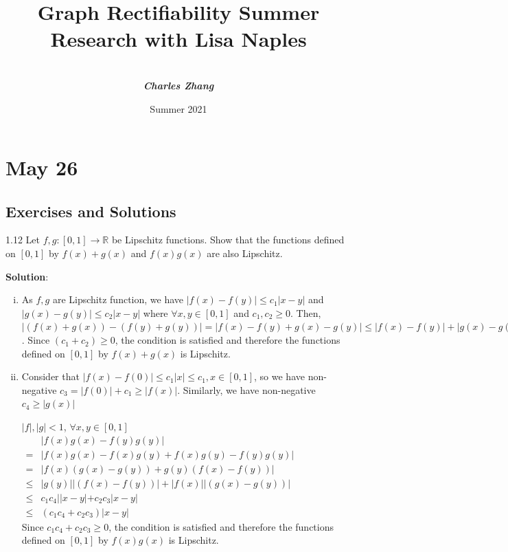 \documentclass[12pt, a4paper]{article}
\title{\textbf{Graph Rectifiability Summer Research with Lisa Naples} \\ [0.5cm] \sffamily{Daily Report}}
\author{\sffamily{By} \\[.2cm] \textbf{\textit{Charles Zhang}}  \\ [.5cm]}
\date{Summer 2021}
\begin{document}
\maketitle

\newpage
{
    \hypersetup{linkcolor=black}
    \tableofcontents
}

\newpage

\section{May 26}
\subsection{Exercises and Solutions}
\begin{customexercise}{1.12}
    Let $f, g:[0,1] \rightarrow \mathbb{R}$ be Lipschitz functions. 
    Show that the functions defined on $[0,1]$ by $f(x)+g(x)$ and 
    $f(x) g(x)$ are also Lipschitz.
\end{customexercise}

\textbf{Solution}:  
\begin{enumerate}[(i)]
    \item As $f, g$ are Lipschitz function, we have $|f(x)-f(y)| \leq c_1|x-y|$ and $|g(x)-g(y)| \leq c_2|x-y|$  where $\forall x, y \in [0, 1]$ and $c_1, c_2 \geq 0$.
    Then, $|(f(x)+g(x)) - (f(y) + g(y))| = |f(x) - f(y) +g(x) - g(y)| \leq  |f(x) - f(y)| + |g(x) - g(y)|\leq (c_1 + c_2 )\cdot |x - y|, \forall x, y\in[0, 1] $. Since $(c_1+c_2)\geq 0$, the condition is satisfied and therefore
    the functions defined on $[0,1]$ by $f(x)+g(x)$ is Lipschitz. 
    \item Consider that $|f(x) -f(0)| \leq c_1 |x| \leq c_1, x\in[0, 1]$, so we have non-negative $c_3 = |f(0)| + c_1 \geq |f(x)|$. Similarly, 
    we have non-negative $c_4 \geq |g(x)|$
    
    $|f|, |g| < 1$, $\forall x, y\in[0, 1]$\\
    $\begin{aligned}
        &|f(x)g(x) - f(y)g(y)| \\
        =& |f(x)g(x) -f(x)g(y) + f(x)g(y)- f(y)g(y)| \\
        =& |f(x)(g(x) - g(y)) + g(y)(f(x) - f(y))| \\ 
        \leq& |g(y)||(f(x) - f(y))| + |f(x)||(g(x) - g(y))| \\
        \leq& c_1 c_4 ||x-y| + c_2 c_3|x-y| \\
        \leq& (c_1c_4 +c_2c_3) |x-y|
    \end{aligned}$\\
    Since $c_1c_4 +c_2c_3 \geq 0$, the condition is satisfied and therefore
    the functions defined on $[0,1]$ by $f(x)g(x)$ is Lipschitz.
\end{enumerate}
\end{document}
